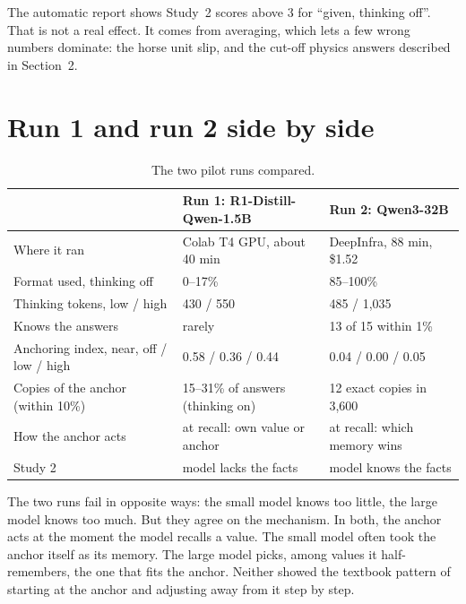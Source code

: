 \documentclass[11pt,a4paper]{article}
\begin{document}
The automatic report shows Study~2 scores above 3 for \enquote{given, thinking off}. That is not a real effect. It comes from averaging, which lets a few wrong numbers dominate: the horse unit slip, and the cut-off physics answers described in Section~2.

\section{Run 1 and run 2 side by side}

\begin{table}[ht]
\centering\small\setlength{\tabcolsep}{4pt}
\begin{tabular}{lll}
\toprule
 & Run 1: R1-Distill-Qwen-1.5B & Run 2: Qwen3-32B \\
\midrule
Where it ran & Colab T4 GPU, about 40 min & DeepInfra, 88 min, \$1.52 \\
Format used, thinking off & 0--17\% & 85--100\% \\
Thinking tokens, low / high & 430 / 550 & 485 / 1,035 \\
Knows the answers & rarely & 13 of 15 within 1\% \\
Anchoring index, near, off / low / high & 0.58 / 0.36 / 0.44 & 0.04 / 0.00 / 0.05 \\
Copies of the anchor (within 10\%) & 15--31\% of answers (thinking on) & 12 exact copies in 3,600 \\
How the anchor acts & at recall: own value or anchor & at recall: which memory wins \\
Study 2 & model lacks the facts & model knows the facts \\
\bottomrule
\end{tabular}
\caption{The two pilot runs compared.}
\label{tab:compare}
\end{table}

The two runs fail in opposite ways: the small model knows too little, the large model knows too much. But they agree on the mechanism. In both, the anchor acts at the moment the model recalls a value. The small model often took the anchor itself as its memory. The large model picks, among values it half-remembers, the one that fits the anchor. Neither showed the textbook pattern of starting at the anchor and adjusting away from it step by step.

\end{document}

